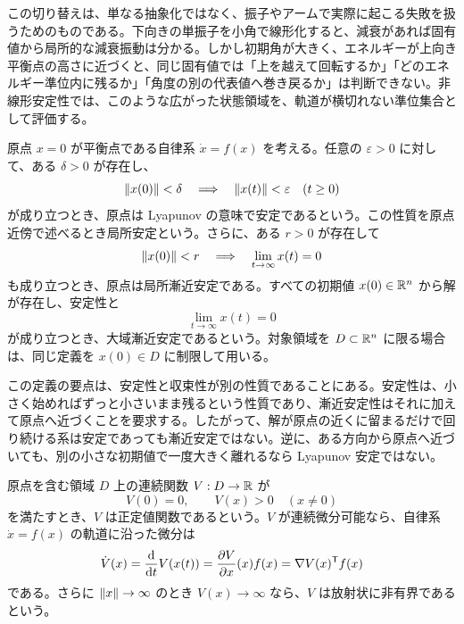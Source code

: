 この切り替えは、単なる抽象化ではなく、振子やアームで実際に起こる失敗を扱うためのものである。下向きの単振子を小角で線形化すると、減衰があれば固有値から局所的な減衰振動は分かる。しかし初期角が大きく、エネルギーが上向き平衡点の高さに近づくと、同じ固有値では「上を越えて回転するか」「どのエネルギー準位内に残るか」「角度の別の代表値へ巻き戻るか」は判断できない。非線形安定性では、このような広がった状態領域を、軌道が横切れない準位集合として評価する。

\begin{definition}
原点 $x=0$ が平衡点である自律系 $\dot{x}=f(x)$ を考える。任意の $\varepsilon>0$ に対して、ある $\delta>0$ が存在し、
\begin{equation}
  \left\|x(0)\right\|<\delta
  \quad\Longrightarrow\quad
  \left\|x(t)\right\|<\varepsilon\quad(t\ge0)
\end{equation}
が成り立つとき、原点は Lyapunov の意味で安定であるという。この性質を原点近傍で述べるとき局所安定という。さらに、ある $r>0$ が存在して
\begin{equation}
  \left\|x(0)\right\|<r
  \quad\Longrightarrow\quad
  \lim_{t\to\infty}x(t)=0
\end{equation}
も成り立つとき、原点は局所漸近安定である。すべての初期値 $x(0)\in\mathbb{R}^n$ から解が存在し、安定性と
\begin{equation}
  \lim_{t\to\infty}x(t)=0
\end{equation}
が成り立つとき、大域漸近安定であるという。対象領域を $D\subset\mathbb{R}^n$ に限る場合は、同じ定義を $x(0)\in D$ に制限して用いる。
\end{definition}

この定義の要点は、安定性と収束性が別の性質であることにある。安定性は、小さく始めればずっと小さいまま残るという性質であり、漸近安定性はそれに加えて原点へ近づくことを要求する。したがって、解が原点の近くに留まるだけで回り続ける系は安定であっても漸近安定ではない。逆に、ある方向から原点へ近づいても、別の小さな初期値で一度大きく離れるなら Lyapunov 安定ではない。

\begin{definition}[正定値関数と軌道に沿った微分]
原点を含む領域 $D$ 上の連続関数 $V:D\to\mathbb{R}$ が
\begin{equation}
  V(0)=0,\qquad V(x)>0\quad(x\ne0)
\end{equation}
を満たすとき、$V$ は正定値関数であるという。$V$ が連続微分可能なら、自律系 $\dot{x}=f(x)$ の軌道に沿った微分は
\begin{equation}
  \dot{V}(x)
  =\frac{\mathrm{d}}{\mathrm{d} t}V(x(t))
  =\frac{\partial V}{\partial x}(x)f(x)
  =\nabla V(x)^{\mathsf{T}} f(x)
\end{equation}
である。さらに $\left\|x\right\|\to\infty$ のとき $V(x)\to\infty$ なら、$V$ は放射状に非有界であるという。
\end{definition}

